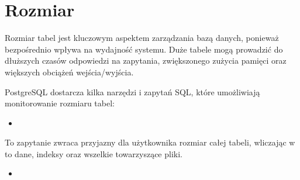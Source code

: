 \documentclass[letterpaper,10pt,polish]{sphinxmanual}
\begin{document}
\section{Rozmiar}
\label{\detokenize{DB-Konfiguracja-bazy-danych/source/rozdzialy/rozdzial2:rozmiar}}
\sphinxAtStartPar
Rozmiar tabel jest kluczowym aspektem zarządzania bazą danych, ponieważ bezpośrednio wpływa na wydajność systemu. Duże tabele mogą prowadzić do dłuższych czasów odpowiedzi na zapytania, zwiększonego zużycia pamięci oraz większych obciążeń wejścia/wyjścia.

\sphinxAtStartPar
{}
PostgreSQL dostarcza kilka narzędzi i zapytań SQL, które umożliwiają monitorowanie rozmiaru tabel:
\begin{itemize}
\item {} 
\sphinxAtStartPar
{}

\end{itemize}

\sphinxAtStartPar
{}

\sphinxAtStartPar
To zapytanie zwraca przyjazny dla użytkownika rozmiar całej tabeli, wliczając w to dane, indeksy oraz wszelkie towarzyszące pliki.
\begin{itemize}
\item {} 
\sphinxAtStartPar
{}

\end{itemize}

\begin{sphinxVerbatim}[commandchars=\\\{\}]
\end{sphinxVerbatim}
\end{document}
